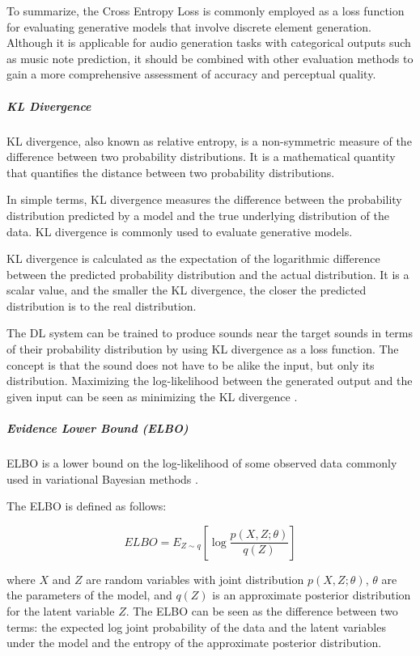 To summarize, the Cross Entropy Loss is commonly employed as a loss function for evaluating generative models that involve discrete element generation. Although it is applicable for audio generation tasks with categorical outputs such as music note prediction, it should be combined with other evaluation methods to gain a more comprehensive assessment of accuracy and perceptual quality.

\subparagraph{KL Divergence} \label{sec:kld}

\acf{KL} divergence, also known as relative entropy, is a non-symmetric measure of the difference between two probability distributions. It is a mathematical quantity that quantifies the distance between two probability distributions.

In simple terms, \ac{KL} divergence measures the difference between the probability distribution predicted by a model and the true underlying distribution of the data. \Ac{KL} divergence is commonly used to evaluate generative models.

\ac{KL} divergence is calculated as the expectation of the logarithmic difference between the predicted probability distribution and the actual distribution. It is a scalar value, and the smaller the \ac{KL} divergence, the closer the predicted distribution is to the real distribution.

The \ac{DL} system can be trained to produce sounds near the target sounds in terms of their probability distribution by using \ac{KL} divergence as a loss function. The concept is that the sound does not have to be alike the input, but only its distribution. Maximizing the log-likelihood between the generated output and the given input can be seen as minimizing the \ac{KL} divergence \cite{huzaifah_deep_2021}.

\subparagraph{Evidence Lower Bound (ELBO)} \label{sec:elbo}

\Acf{ELBO} is a lower bound on the log-likelihood of some observed data commonly used in variational Bayesian methods \cite{blei_variational_2017}.

The \ac{ELBO} is defined as follows:

\begin{equation}
ELBO = E_{Z \sim q}\left[\log \frac{p(X,Z; \theta)}{q(Z)} \right]
\end{equation}

where $X$ and $Z$ are random variables with joint distribution $p(X,Z; \theta)$, $\theta$ are the parameters of the model, and $q(Z)$ is an approximate posterior distribution for the latent variable $Z$. The \ac{ELBO} can be seen as the difference between two terms: the expected log joint probability of the data and the latent variables under the model and the entropy of the approximate posterior distribution.

